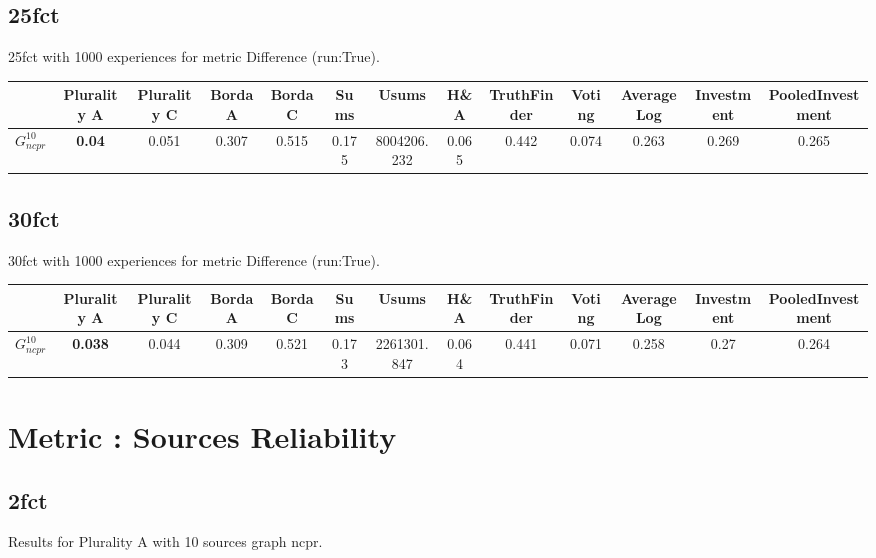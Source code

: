 \documentclass{article}
\newcommand{\graph}[2]{$G_{#1}^{#2}$}
\begin{document}
\subsection{25fct}

25fct with 1000 experiences for metric Difference (run:True).

\noindent\begin{tabular}{|l|c|c|c|c|c|c|c|c|c|c|c|c|}
\hline
& Plurality A& Plurality C& Borda A& Borda C& Sums& Usums& H\&A& TruthFinder& Voting& AverageLog& Investment& PooledInvestment\\
\hline
\graph{ncpr}{10} &\textbf{0.04}&0.051&0.307&0.515&0.175&8004206.232&0.065&0.442&0.074&0.263&0.269&0.265\\
\hline
\end{tabular}
\newpage

\subsection{30fct}

30fct with 1000 experiences for metric Difference (run:True).

\noindent\begin{tabular}{|l|c|c|c|c|c|c|c|c|c|c|c|c|}
\hline
& Plurality A& Plurality C& Borda A& Borda C& Sums& Usums& H\&A& TruthFinder& Voting& AverageLog& Investment& PooledInvestment\\
\hline
\graph{ncpr}{10} &\textbf{0.038}&0.044&0.309&0.521&0.173&2261301.847&0.064&0.441&0.071&0.258&0.27&0.264\\
\hline
\end{tabular}
\newpage
\newpage
\section{Metric : Sources Reliability}

\newpage
\newpage

\subsection{2fct}

\noindent Results for Plurality A with 10 sources graph ncpr.
\end{document}

